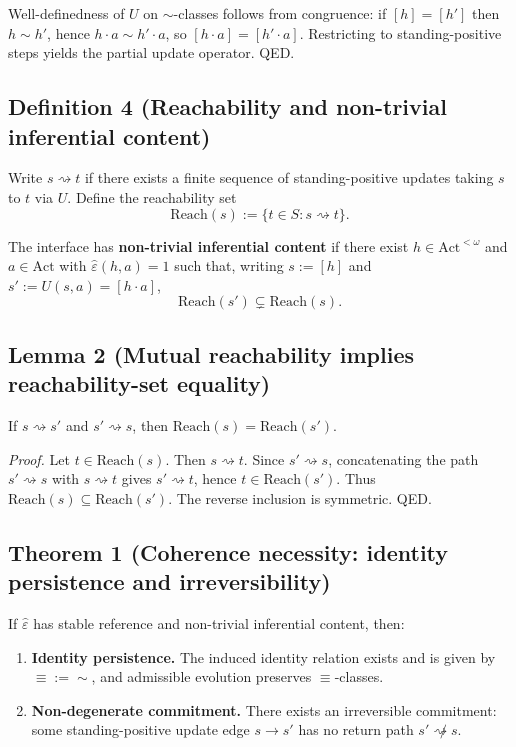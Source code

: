 \documentclass[12pt]{article}
\theoremstyle{plain}
\begin{document}
Well-definedness of $U$ on $\sim$-classes follows from congruence: if $[h]=[h']$ then $h\sim h'$, hence $h\cdot a\sim h'\cdot a$, so $[h\cdot a]=[h'\cdot a]$. Restricting to standing-positive steps yields the partial update operator. QED.

\subsection{Definition 4 (Reachability and non-trivial inferential content)}

Write $s\rightsquigarrow t$ if there exists a finite sequence of standing-positive updates taking $s$ to $t$ via $U$. Define the reachability set
\[
\mathrm{Reach}(s):=\{t\in S: s\rightsquigarrow t\}.
\]

The interface has \textbf{non-trivial inferential content} if there exist $h\in\mathrm{Act}^{<\omega}$ and $a\in\mathrm{Act}$ with $\widehat\varepsilon(h,a)=1$ such that, writing $s:=[h]$ and $s':=U(s,a)=[h\cdot a]$,
\[
\mathrm{Reach}(s')\subsetneq \mathrm{Reach}(s).
\]

\subsection{Lemma 2 (Mutual reachability implies reachability-set equality)}

If $s\rightsquigarrow s'$ and $s'\rightsquigarrow s$, then $\mathrm{Reach}(s)=\mathrm{Reach}(s')$.

\textit{Proof.} Let $t\in\mathrm{Reach}(s)$. Then $s\rightsquigarrow t$. Since $s'\rightsquigarrow s$, concatenating the path $s'\rightsquigarrow s$ with $s\rightsquigarrow t$ gives $s'\rightsquigarrow t$, hence $t\in\mathrm{Reach}(s')$. Thus $\mathrm{Reach}(s)\subseteq \mathrm{Reach}(s')$. The reverse inclusion is symmetric. QED.

\subsection{Theorem 1 (Coherence necessity: identity persistence and irreversibility)}

If $\widehat\varepsilon$ has stable reference and non-trivial inferential content, then:

\begin{enumerate}[leftmargin=*]
\item \textbf{Identity persistence.} The induced identity relation exists and is given by $\equiv:=\sim$, and admissible evolution preserves $\equiv$-classes.
\item \textbf{Non-degenerate commitment.} There exists an irreversible commitment: some standing-positive update edge $s\to s'$ has no return path $s'\not\rightsquigarrow s$.
\end{enumerate}
\end{document}
